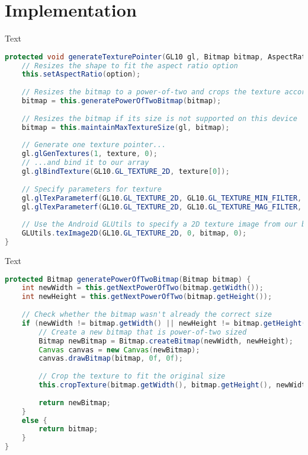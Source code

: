 \section{Implementation}

Text

\begin{lstlisting}[language=java,caption={Generates an \ac{opengles} texture pointer.},label=lst:texturepointer] 
protected void generateTexturePointer(GL10 gl, Bitmap bitmap, AspectRatio option) {
    // Resizes the shape to fit the aspect ratio option
    this.setAspectRatio(option);
    
    // Resizes the bitmap to a power-of-two and crops the texture accordingly
    bitmap = this.generatePowerOfTwoBitmap(bitmap);
    
    // Resizes the bitmap if its size is not supported on this device
    bitmap = this.maintainMaxTextureSize(gl, bitmap);
    
    // Generate one texture pointer...
    gl.glGenTextures(1, texture, 0);
    // ...and bind it to our array
    gl.glBindTexture(GL10.GL_TEXTURE_2D, texture[0]);
    
    // Specify parameters for texture
    gl.glTexParameterf(GL10.GL_TEXTURE_2D, GL10.GL_TEXTURE_MIN_FILTER, GL10.GL_LINEAR);
    gl.glTexParameterf(GL10.GL_TEXTURE_2D, GL10.GL_TEXTURE_MAG_FILTER, GL10.GL_LINEAR);
    
    // Use the Android GLUtils to specify a 2D texture image from our bitmap
    GLUtils.texImage2D(GL10.GL_TEXTURE_2D, 0, bitmap, 0);
}
\end{lstlisting}

Text

\begin{lstlisting}[language=java,caption={How we generate \ac{pot} sized texture.},label=lst:pot] 
protected Bitmap generatePowerOfTwoBitmap(Bitmap bitmap) {
    int newWidth = this.getNextPowerOfTwo(bitmap.getWidth());
    int newHeight = this.getNextPowerOfTwo(bitmap.getHeight());
    
    // Check whether the bitmap wasn't already the correct size
    if (newWidth != bitmap.getWidth() || newHeight != bitmap.getHeight()) {
        // Create a new bitmap that is power-of-two sized
        Bitmap newBitmap = Bitmap.createBitmap(newWidth, newHeight);
        Canvas canvas = new Canvas(newBitmap);
        canvas.drawBitmap(bitmap, 0f, 0f);
        
        // Crop the texture to fit the original size
        this.cropTexture(bitmap.getWidth(), bitmap.getHeight(), newWidth, newHeight);
        
        return newBitmap;
    }
    else {
        return bitmap;
    }
}
\end{lstlisting}

